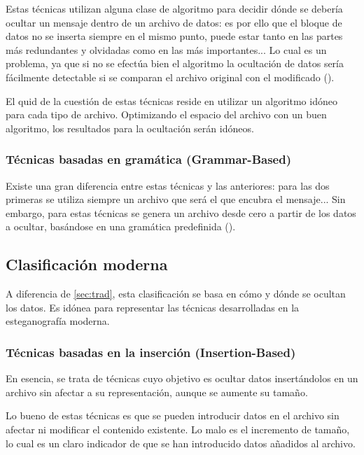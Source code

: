 Estas técnicas utilizan alguna clase de algoritmo para decidir dónde se debería ocultar un mensaje dentro de un archivo de datos: es por ello que el bloque de datos no se inserta siempre en el mismo punto, puede estar tanto en las partes más redundantes y olvidadas como en las más importantes... Lo cual es un problema, ya que si no se efectúa bien el algoritmo la ocultación de datos sería fácilmente detectable si se comparan el archivo original con el modificado (\cite{esteganografia-digital}). %

El quid de la cuestión de estas técnicas reside en utilizar un algoritmo idóneo para cada tipo de archivo. Optimizando el espacio del archivo con un buen algoritmo, los resultados para la ocultación serán idóneos.

\subsubsection{Técnicas basadas en gramática (Grammar-Based)}

Existe una gran diferencia entre estas técnicas y las anteriores: para las dos primeras se utiliza siempre un archivo que será el que encubra el mensaje... Sin embargo, para estas técnicas se genera un archivo desde cero a partir de los datos a ocultar, basándose en una gramática predefinida (\cite{esteganografia-digital}). %

\subsection{Clasificación moderna}

A diferencia de \ref{sec:trad}, esta clasificación se basa en cómo y dónde se ocultan los datos. Es idónea para representar las técnicas desarrolladas en la esteganografía moderna.

\subsubsection{Técnicas basadas en la inserción (Insertion-Based)}

En esencia, se trata de técnicas cuyo objetivo es ocultar datos insertándolos en un archivo sin afectar a su representación, aunque se aumente su tamaño.

Lo bueno de estas técnicas es que se pueden introducir datos en el archivo sin afectar ni modificar el contenido existente. Lo malo es el incremento de tamaño, lo cual es un claro indicador de que se han introducido datos añadidos al archivo.


